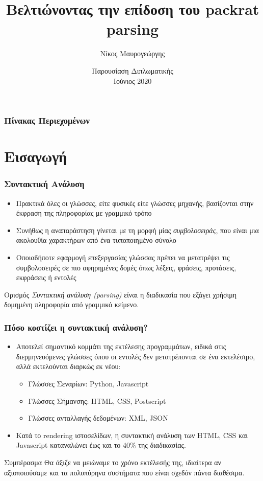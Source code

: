 \documentclass{beamer}
\title[Βελτιώνοντας την επίδοση του packrat parsing] %
{Βελτιώνοντας την επίδοση του packrat parsing}
\author[Νίκος, Μαυρογεώργης] %
{Νίκος Μαυρογεώργης}
\institute[ECE, NTUA] %
{
  Σχολή Ηλεκτρολόγων Μηχανικών και Μηχανικών Υπολογιστών\\
  Εθνικό Μετσόβειο Πολυτεχνείο
}
\date[NTUA 2020] %
{Παρουσίαση Διπλωματικής \\ Ιούνιος 2020}
\begin{document}
\frame{\titlepage}

\begin{frame}
\frametitle{Πίνακας Περιεχομένων}
\tableofcontents
\end{frame}

\section{Εισαγωγή}

\begin{frame}
  \frametitle{Συντακτική Ανάλυση}
  \begin{itemize}	
	\item Πρακτικά όλες οι γλώσσες, είτε φυσικές είτε γλώσσες μηχανής, βασίζονται στην έκφραση της πληροφορίας με γραμμικό τρόπο
	\item Συνήθως η αναπαράστηση γίνεται με τη μορφή μίας \textit{συμβολοσειράς}, που είναι μια ακολουθία χαρακτήρων από ένα τυποποιημένο σύνολο
	\item Οποιαδήποτε εφαρμογή επεξεργασίας γλώσσας πρέπει να μετατρέψει τις συμβολοσειρές σε πιο αφηρημένες δομές όπως λέξεις, φράσεις, προτάσεις, εκφράσεις ή εντολές \pause
  \end{itemize}

\begin{block}{Ορισμός}
  \textit{Συντακτική ανάλυση (parsing)} είναι η διαδικασία που εξάγει χρήσιμη δομημένη πληροφορία από γραμμικό κείμενο.
\end{block}

\end{frame}

\begin{frame}
  \frametitle{Πόσο κοστίζει η συντακτική ανάλυση?} \pause
  \begin{itemize}
	\item Αποτελεί σημαντικό κομμάτι της εκτέλεσης προγραμμάτων, ειδικά στις διερμηνευόμενες γλώσσες όπου οι εντολές δεν μετατρέπονται σε ένα εκτελέσιμο, αλλά εκτελούνται διαρκώς εκ νέου:
  \begin{itemize}
	\item Γλώσσες Σεναρίων: Python, Javascript
	\item Γλώσσες Σήμανσης: HTML, CSS, Postscript
	\item Γλώσσες ανταλλαγής δεδομένων: XML, JSON \pause
  \end{itemize}
\item Κατά το rendering ιστοσελίδων, η συντακτική ανάλυση των HTML, CSS και Javascript καταναλώνει έως και το 40\% της διαδικασίας. \pause
  \end{itemize}

  \begin{block}{Συμπέρασμα}
	Θα άξιζε να μειώναμε το χρόνο εκτέλεσής της, ιδιαίτερα αν αξιοποιούσαμε και τα πολυπύρηνα συστήματα που είναι σχεδόν πάντα διαθέσιμα.
  \end{block}
\end{frame}
\end{document}
